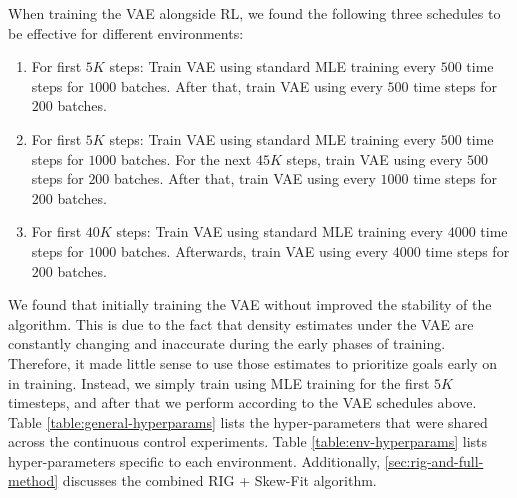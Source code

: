 When training the VAE alongside RL, we found the following three schedules to be effective for different environments:

\begin{enumerate}
    \item For first $5K$ steps: Train VAE using standard MLE training every $500$ time steps for $1000$ batches. After that, train VAE using \METHOD every $500$ time steps for $200$ batches.
    \item For first $5K$ steps: Train VAE using standard MLE training every $500$ time steps for $1000$ batches. For the next $45K$ steps, train VAE using \METHOD every $500$ steps for $200$ batches. After that, train VAE using \METHOD every $1000$ time steps for $200$ batches.
    \item For first $40K$ steps: Train VAE using standard MLE training every $4000$ time steps for $1000$ batches. Afterwards, train VAE using \METHOD every $4000$ time steps for $200$ batches.
\end{enumerate}

We found that initially training the VAE without \METHOD improved the stability of the algorithm.
This is due to the fact that density estimates under the VAE are constantly changing and inaccurate during the early phases of training. Therefore, it made little sense to use those estimates to prioritize goals early on in training.
Instead, we simply train using MLE training for the first $5K$ timesteps, and after that we perform \METHOD according to the VAE schedules above. Table \ref{table:general-hyperparams} lists the hyper-parameters that were shared across the continuous control experiments. Table \ref{table:env-hyperparams} lists hyper-parameters specific to each environment. Additionally, \autoref{sec:rig-and-full-method} discusses the combined RIG + Skew-Fit algorithm.

